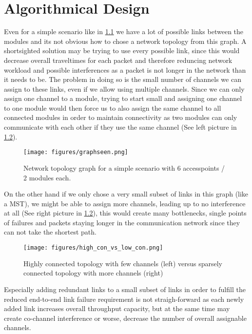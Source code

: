 \chapter{Algorithmical Design}
  Even for a simple scenario like in \ref{fig:graphseen} we have a lot of possible links between the modules and its not obvious how to
  chose a network topology from this graph.
  A shortsighted solution may be trying to use every possible link, since this would decrease overall traveltimes for each packet and therefore
  reduncing network workload and possible interferences as a packet is not longer in the network than it needs to be. 
  The problem in doing so is the small number of channels we can assign to these links, even if we allow using multiple channels.
  Since we can only assign one channel to a module, trying to start small and assigning one channel to one module would then force us to also 
  assign the same channel to all connected modules in order to maintain connectivity as two modules can only communicate with each other if they use the same channel
  (See left picture in \ref{fig:high_con_vs_low_con}). 
  
  \begin{figure}[h!]
    \centering
    \texttt{[image: figures/graphseen.png]}
    \caption{Network topology graph for a simple scenario with 6 accesspoints / 2 modules each.}
    \label{fig:graphseen}
  \end{figure}

  On the other hand if we only chose a very small subset of links in this graph (like a MST), we might be able to 
  assign more channels, leading up to no interference at all (See right picture in \ref{fig:high_con_vs_low_con}),
  this would create many bottlenecks, single points of failures and packets staying longer in the communication network since they can not take the shortest path.

  \begin{figure}[h!]
    \centering
    \texttt{[image: figures/high\_con\_vs\_low\_con.png]}
    \caption{Highly connected topology with few channels (left) versus sparsely connected topology with more channels (right)}
    \label{fig:high_con_vs_low_con}
  \end{figure}
  
  Especially adding redundant links to a small subset of links in order to fulfill the reduced end-to-end link failure requirement is not straigh-forward as each newly
  added link increases overall throughput capacity, but at the same time may create co-channel interference or worse, decrease the number of overall assignable channels.
  
